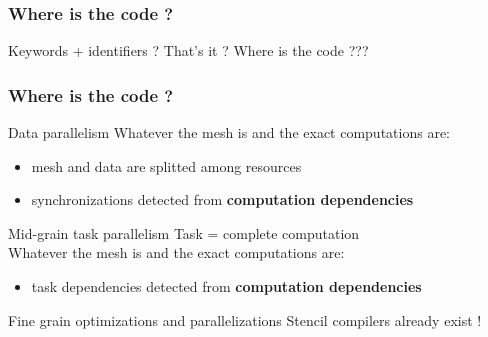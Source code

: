 \documentclass{beamer}
\begin{document}
\begin{frame}[fragile]
\frametitle{Where is the code ?}
Keywords + identifiers ? That's it ? Where is the code ???
\end{frame}

\begin{frame}[fragile]
\frametitle{Where is the code ?}
\begin{block}{Data parallelism}
Whatever the mesh is and the exact computations are:
\begin{itemize}
\item mesh and data are splitted among resources
\item synchronizations detected from \textbf{computation dependencies}
\end{itemize}
\end{block}

\begin{block}{Mid-grain task parallelism}
Task = complete computation\\
Whatever the mesh is and the exact computations are:
\begin{itemize}
\item task dependencies detected from \textbf{computation dependencies}
\end{itemize}
\end{block}

\begin{alertblock}{Fine grain optimizations and parallelizations}
Stencil compilers already exist !
\end{alertblock}

\end{frame}
\end{document}
